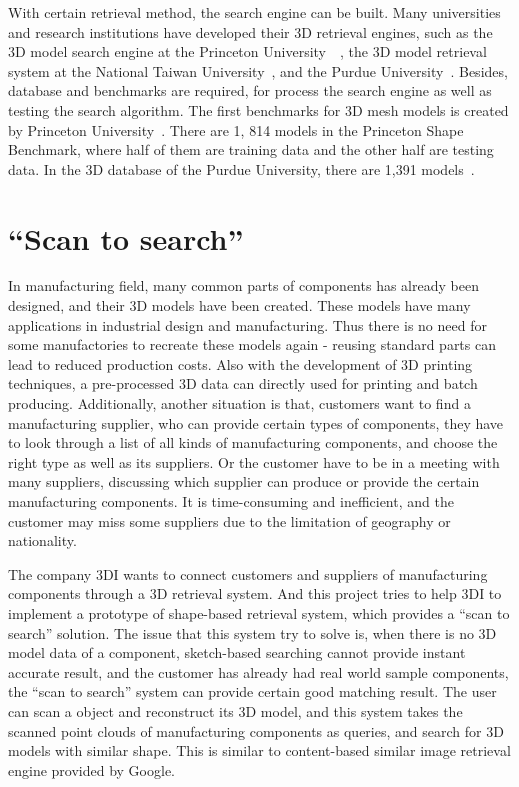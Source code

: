 With certain retrieval method, the search engine can be built. Many universities and research institutions have developed their 3D retrieval engines, such as the 3D model search engine at the Princeton University~\cite{shilane2004princeton}~\cite{min2003early}, the 3D model retrieval system at the National Taiwan University~\cite{shen20033d}, and the Purdue University~\cite{iyer2005engineering}. Besides, database and benchmarks are required, for process the search engine as well as testing the search algorithm. The first benchmarks for 3D mesh models is created by Princeton University~\cite{shilane2004princeton}. There are 1, 814 models in the Princeton Shape Benchmark, where half of them are training data and the other half are testing data. In the 3D database of the Purdue University, there are 1,391 models~\cite{iyer2005engineering}.

\section{``Scan to search''} \label{sec:designchoice}

In manufacturing field, many common parts of components has already been designed, and their 3D models have been created. These models have many applications in industrial design and manufacturing. Thus there is no need for some manufactories to recreate these models again - reusing standard parts can lead to reduced production costs. Also with the development of 3D printing techniques, a pre-processed 3D data can directly used for printing and batch producing. Additionally, another situation is that, customers want to find a manufacturing supplier, who can provide certain types of components, they have to look through a list of all kinds of manufacturing components, and choose the right type as well as its suppliers. Or the customer have to be in a meeting with many suppliers, discussing which supplier can produce or provide the certain manufacturing components. It is time-consuming and inefficient, and the customer may miss some suppliers due to the limitation of geography or nationality. 

The company 3DI wants to connect customers and suppliers of manufacturing components through a 3D retrieval system. And this project tries to help 3DI to implement a prototype of shape-based retrieval system, which provides a ``scan to search'' solution. The issue that this system try to solve is, when there is no 3D model data of a component, sketch-based searching cannot provide instant accurate result, and the customer has already had real world sample components, the ``scan to search'' system can provide certain good matching result. The user can scan a object and reconstruct its 3D model, and this system takes the scanned point clouds of manufacturing components as queries, and search for 3D models with similar shape. This is similar to content-based similar image retrieval engine provided by Google. 

